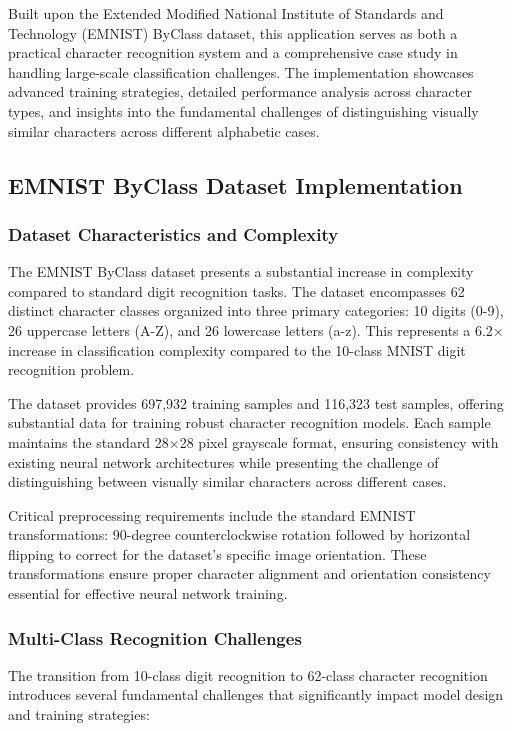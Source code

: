 \documentclass[11pt,a4paper]{report}
\begin{document}
Built upon the Extended Modified National Institute of Standards and Technology (EMNIST) ByClass dataset, this application serves as both a practical character recognition system and a comprehensive case study in handling large-scale classification challenges. The implementation showcases advanced training strategies, detailed performance analysis across character types, and insights into the fundamental challenges of distinguishing visually similar characters across different alphabetic cases.

\subsection{EMNIST ByClass Dataset Implementation}

\subsubsection{Dataset Characteristics and Complexity}

The EMNIST ByClass dataset presents a substantial increase in complexity compared to standard digit recognition tasks. The dataset encompasses 62 distinct character classes organized into three primary categories: 10 digits (0-9), 26 uppercase letters (A-Z), and 26 lowercase letters (a-z). This represents a 6.2× increase in classification complexity compared to the 10-class MNIST digit recognition problem.

The dataset provides 697,932 training samples and 116,323 test samples, offering substantial data for training robust character recognition models. Each sample maintains the standard 28×28 pixel grayscale format, ensuring consistency with existing neural network architectures while presenting the challenge of distinguishing between visually similar characters across different cases.

Critical preprocessing requirements include the standard EMNIST transformations: 90-degree counterclockwise rotation followed by horizontal flipping to correct for the dataset's specific image orientation. These transformations ensure proper character alignment and orientation consistency essential for effective neural network training.

\subsubsection{Multi-Class Recognition Challenges}

The transition from 10-class digit recognition to 62-class character recognition introduces several fundamental challenges that significantly impact model design and training strategies:
\end{document}
